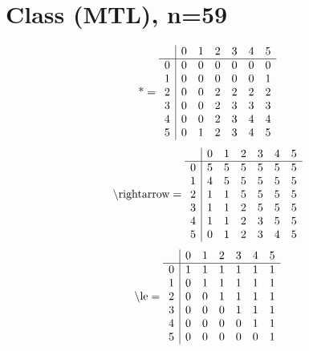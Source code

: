 \documentclass[11pt]{article}
\begin{document}
\section{Class (MTL), n=59}
\[\text{*} = 
\begin{array}{r | r r r r r r}
 & 0 & 1 & 2 & 3 & 4 & 5 \\ \hline
0 & 0 & 0 & 0 & 0 & 0 & 0 \\
1 & 0 & 0 & 0 & 0 & 0 & 1 \\
2 & 0 & 0 & 2 & 2 & 2 & 2 \\
3 & 0 & 0 & 2 & 3 & 3 & 3 \\
4 & 0 & 0 & 2 & 3 & 4 & 4 \\
5 & 0 & 1 & 2 & 3 & 4 & 5 \\
\end{array}
\]
\[\text{\textbackslash rightarrow} = 
\begin{array}{r | r r r r r r}
 & 0 & 1 & 2 & 3 & 4 & 5 \\ \hline
0 & 5 & 5 & 5 & 5 & 5 & 5 \\
1 & 4 & 5 & 5 & 5 & 5 & 5 \\
2 & 1 & 1 & 5 & 5 & 5 & 5 \\
3 & 1 & 1 & 2 & 5 & 5 & 5 \\
4 & 1 & 1 & 2 & 3 & 5 & 5 \\
5 & 0 & 1 & 2 & 3 & 4 & 5 \\
\end{array}
\]
\[\text{\textbackslash le} = 
\begin{array}{r | r r r r r r}
 & 0 & 1 & 2 & 3 & 4 & 5 \\ \hline
0 & 1 & 1 & 1 & 1 & 1 & 1 \\
1 & 0 & 1 & 1 & 1 & 1 & 1 \\
2 & 0 & 0 & 1 & 1 & 1 & 1 \\
3 & 0 & 0 & 0 & 1 & 1 & 1 \\
4 & 0 & 0 & 0 & 0 & 1 & 1 \\
5 & 0 & 0 & 0 & 0 & 0 & 1 \\
\end{array}
\]
\end{document}
